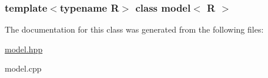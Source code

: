 \subsubsection*{template$<$typename R$>$ class model$<$ R $>$}



The documentation for this class was generated from the following files:\begin{DoxyCompactItemize}
\item 
\hyperlink{model_8hpp}{model.hpp}\item 
model.cpp\end{DoxyCompactItemize}
